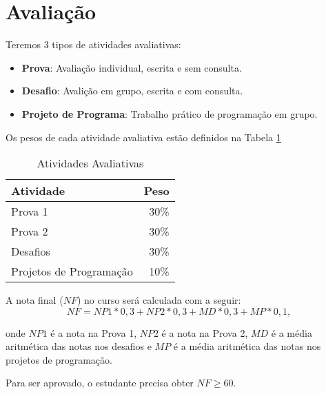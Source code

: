 \chapter*{Avalia\c{c}\~ao}

Teremos 3 tipos de atividades avaliativas:

\begin{itemize}
\item \textbf{Prova}: Avalia\c{c}\~ao individual, escrita e sem consulta.
\item \textbf{Desafio}: Avali\c{c}\~ao em grupo, escrita e com consulta.
\item \textbf{Projeto de Programa}: Trabalho pr\'atico de programa\c{c}\~ao em grupo.
\end{itemize}

Os pesos de cada atividade avaliativa est\~ao definidos na Tabela \ref{tab:avaliacao}

\begin{table}[htdp]
\caption{Atividades Avaliativas}
\begin{center}
\begin{tabular}{lr}
\hline
\textbf{Atividade} & \textbf{Peso} \\
\hline
Prova 1 & 30\% \\
\hline
Prova 2 & 30\% \\
\hline
Desafios & 30\% \\
\hline
Projetos de Programa\c{c}\~ao & 10\% \\
\hline
\end{tabular}
\end{center}
\label{tab:avaliacao}
\end{table}%

A nota final ($NF$) no curso ser\'a calculada com a seguir:
\begin{equation}
NF = NP1 * 0,3 +  NP2 * 0,3 +  MD * 0,3 + MP * 0,1,
\end{equation}

onde $NP1$ \'e a nota na Prova 1, $NP2$ \'e a nota na Prova 2, $MD$ \'e a m\'edia aritm\'etica das notas nos desafios e $MP$ \'e a m\'edia aritm\'etica das notas nos projetos de programa\c{c}\~ao.

Para ser aprovado, o estudante precisa obter $NF \geq 60$.

